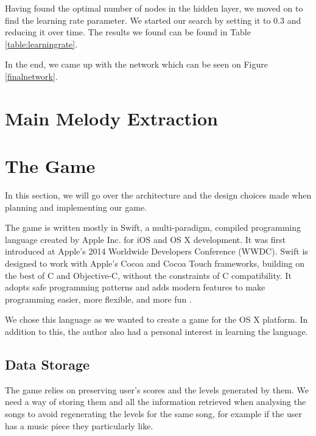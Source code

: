 Having found the optimal number of nodes in the hidden layer, we moved on to find the learning rate parameter. We started our search by setting it to 0.3 and reducing it over time. The results we found can be found in Table \ref{table:learningrate}.


In the end, we came up with the network which can be seen on Figure \ref{finalnetwork}.

\vspace{20pt}

\section{Main Melody Extraction}

\vspace{10pt}

\section{The Game}

In this section, we will go over the architecture and the design choices made when planning and implementing our game.

The game is written mostly in Swift, a multi-paradigm, compiled programming language created by Apple Inc. for iOS and OS X development. 
It was first introduced at Apple's 2014 Worldwide Developers Conference (WWDC). Swift is designed to work with Apple's Cocoa and Cocoa Touch frameworks, building on the best of C and Objective-C, without the constraints of C compatibility. It adopts safe programming patterns and adds modern features to make programming easier, more flexible, and more fun \cite{swiftintro}. 

We chose this language as we wanted to create a game for the OS X platform. In addition to this, the author also had a personal interest in learning the language.

\vspace{10pt}

\subsection{Data Storage}

The game relies on preserving user's scores and the levels generated by them. We need a way of storing them and all the information retrieved when analysing the songs to avoid regenerating the levels for the same song, for example if the user has a music piece they particularly like.


